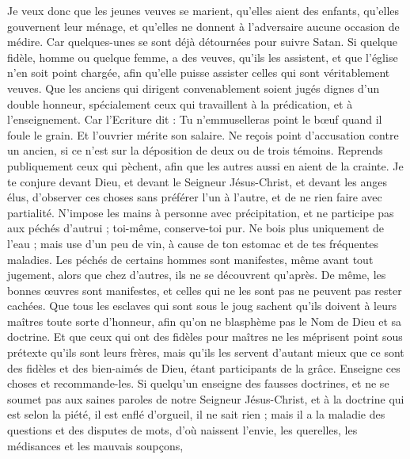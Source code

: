 \begin{multicols}{2}
Je veux donc que les jeunes veuves se marient, qu'elles aient des enfants, qu'elles gouvernent leur ménage, et qu'elles ne donnent à l'adversaire aucune occasion de médire.
Car quelques-unes se sont déjà détournées pour suivre Satan.
Si quelque fidèle, homme ou quelque femme, a des veuves, qu'ils les assistent, et que l'église n'en soit point chargée, afin qu’elle puisse assister celles qui sont véritablement veuves.
Que les anciens qui dirigent convenablement soient jugés dignes d'un double honneur, spécialement ceux qui travaillent à la prédication, et à l’enseignement.
Car l’Ecriture dit : Tu n’emmuselleras point le bœuf quand il foule le grain. Et l'ouvrier mérite son salaire.
Ne reçois point d'accusation contre un ancien, si ce n’est sur la déposition de deux ou de trois témoins.
Reprends publiquement ceux qui pèchent, afin que les autres aussi en aient de la crainte.
Je te conjure devant Dieu, et devant le Seigneur Jésus-Christ, et devant les anges élus, d’observer ces choses sans préférer l'un à l'autre, et de ne rien faire avec partialité.
N'impose les mains à personne avec précipitation, et ne participe pas aux péchés d'autrui ; toi-même, conserve-toi pur.
Ne bois plus uniquement de l’eau ; mais use d’un peu de vin, à cause de ton estomac et de tes fréquentes maladies.
Les péchés de certains hommes sont manifestes, même avant tout jugement, alors que chez d'autres, ils ne se découvrent qu'après.
De même, les bonnes œuvres sont manifestes, et celles qui ne les sont pas ne peuvent pas rester cachées.
\VerseOne{}Que tous les esclaves qui sont sous le joug sachent qu'ils doivent à leurs maîtres toute sorte d'honneur, afin qu'on ne blasphème pas le Nom de Dieu et sa doctrine.
Et que ceux qui ont des fidèles pour maîtres ne les méprisent point sous prétexte qu'ils sont leurs frères, mais qu’ils les servent d’autant mieux que ce sont des fidèles et des bien-aimés de Dieu, étant participants de la grâce. Enseigne ces choses et recommande-les.
Si quelqu'un enseigne des fausses doctrines, et ne se soumet pas aux saines paroles de notre Seigneur Jésus-Christ, et à la doctrine qui est selon la piété,
il est enflé d'orgueil, il ne sait rien ; mais il a la maladie des questions et des disputes de mots, d'où naissent l’envie, les querelles, les médisances et les mauvais soupçons,

\end{multicols}

